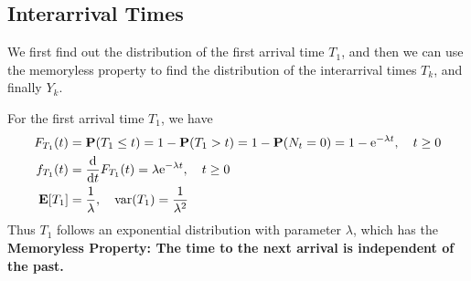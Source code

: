 \documentclass[device=normal, lang=en]{elegantbook}
\numberwithin{equation}{section}
\begin{document}
\subsection{Interarrival Times}
We first find out the distribution of the first arrival time $T_1$, and then we can use the memoryless property to find the distribution of the interarrival times $T_k$, and finally $Y_k$.

For the first arrival time $T_1$, we have
\begin{align}
    F_{T_1}(t) &= \mathbf{P}(T_1 \leq t) = 1 - \mathbf{P}(T_1 > t) = 1 - \mathbf{P}(N_t = 0) = 1 - \mathrm{e}^{-\lambda t}, \quad t \geq 0 \\ 
    f_{T_1}(t) &= \dv{t} F_{T_1}(t) = \lambda \mathrm{e}^{-\lambda t}, \quad t \geq 0 \\ 
    \mathbf{E}[T_1] &= \frac{1}{\lambda}, \quad \mathrm{var}(T_1) = \frac{1}{\lambda^2}
\end{align}
Thus $T_1$ follows an exponential distribution with parameter $\lambda$, which has the \textbf{Memoryless Property: The time to the next arrival is independent of the past.}
\end{document}
